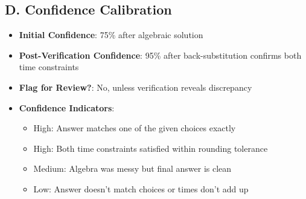 \documentclass[11pt]{article}
\begin{document}
\begin{verificationbox}
\subsection*{D. Confidence Calibration}
\begin{itemize}[leftmargin=*]
    \item \textbf{Initial Confidence}: 75\% after algebraic solution
    \item \textbf{Post-Verification Confidence}: 95\% after back-substitution confirms both time constraints
    \item \textbf{Flag for Review?}: No, unless verification reveals discrepancy
    \item \textbf{Confidence Indicators}:
    \begin{itemize}[leftmargin=*]
        \item High: Answer matches one of the given choices exactly
        \item High: Both time constraints satisfied within rounding tolerance
        \item Medium: Algebra was messy but final answer is clean
        \item Low: Answer doesn't match choices or times don't add up
    \end{itemize}
\end{itemize}
\end{verificationbox}
\end{document}

